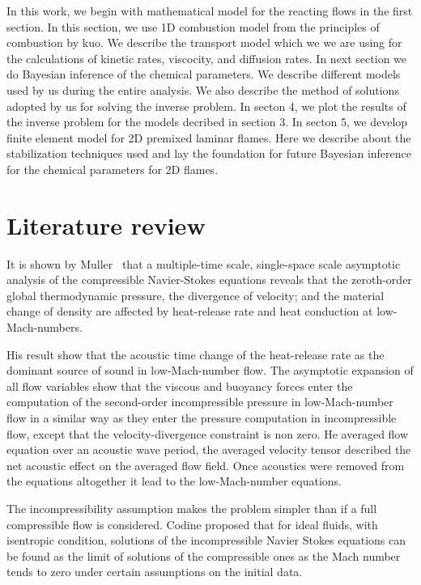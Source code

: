 \bigskip
\noindent In this work, we begin with mathematical model for the reacting flows in the first section. In this section, we use 1D combustion model from the principles of combustion by kuo. We describe the transport model which we we are using for the calculations of kinetic rates, viscocity, and diffusion rates. In next section we do Bayesian inference of the chemical parameters. We describe different models used by us during the entire analysis. We also describe the method of solutions adopted by us for solving the inverse problem. In secton 4, we plot the results of the inverse problem for the models decribed in section 3. In secton 5, we develop finite element model for 2D premixed laminar flames. Here we describe about the stabilization techniques used and lay the foundation for future Bayesian inference for the chemical parameters for 2D flames.  


\section{Literature review}

It is shown by Muller~\cite{Muller} that a multiple-time scale, single-space scale asymptotic analysis of the compressible Navier-Stokes equations reveals that the zeroth-order global thermodynamic pressure, the divergence of velocity; and the material change of density are affected by heat-release rate and heat conduction at low-Mach-numbers.

\bigskip 
\noindent His result show that the acoustic time change of the heat-release rate as the dominant source of sound in low-Mach-number flow. The asymptotic expansion of all flow variables show that the viscous and buoyancy forces enter the computation of the second-order incompressible pressure in low-Mach-number flow in a similar way as they enter the pressure computation in incompressible flow, except that the
velocity-divergence constraint is non zero. He averaged flow equation over an acoustic wave period, the averaged velocity tensor described the net acoustic effect on the averaged flow field. Once acoustics were removed from the equations altogether it lead to the low-Mach-number equations.

\bigskip
\noindent The incompressibility assumption makes the problem simpler than if a full compressible flow is considered. Codine\cite{Codina} proposed that for ideal fluids, with isentropic condition, solutions of the incompressible Navier Stokes equations can be found as the limit of solutions of the compressible ones as the Mach number tends to zero under certain assumptions on the initial data.

